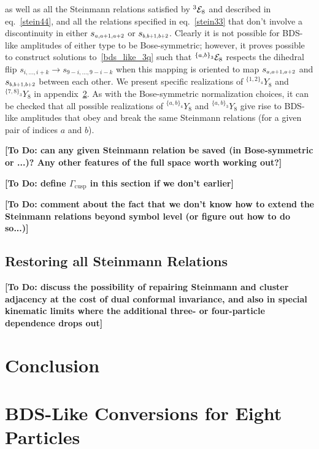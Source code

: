 \documentclass[11pt]{article}
\def\draftnote#1{{\bf [#1]}}
\def\mand#1{\scaleto{s}{4.6pt}_{\scaleto{#1}{5.2pt}}}
\def\EthreeJ{{}^{{\{a,b\}}_3} {\cal E}_8}
\begin{document}
as well as all the Steinmann relations satisfied by ${}^3 {\cal E}_8$ and described in eq.~\eqref{stein44}, and all the relations specified in eq.~\eqref{stein33} that don't involve a discontinuity in either $\mand{a,a+1,a+2}$ or $\mand{b,b+1,b+2}$. Clearly it is not possible for BDS-like amplitudes of either type to be Bose-symmetric; however, it proves possible to construct solutions to~\eqref{bds_like_3q} such that $\EthreeJ$ respects the dihedral flip $s_{i,\dots,i+k} \rightarrow s_{9-i,\dots,9-i-k}$ when this mapping is oriented to map $\mand{a,a+1,a+2}$ and $\mand{b,b+1,b+2}$ between each other. We present specific realizations of ${}^{{\{1,2\}}_4} Y_{8}$ and ${}^{{\{7,8\}}_3} Y_{8}$ in appendix~\ref{appendix:bds_like}. As with the Bose-symmetric normalization choices, it can be checked that all possible realizations of ${}^{{\{a,b\}}_4} Y_{8}$ and ${}^{{\{a,b\}}_3} Y_{8}$ give rise to BDS-like amplitudes that obey and break the same Steinmann relations (for a given pair of indices $a$ and $b$). 



\newpage

\draftnote{To Do: can any given Steinmann relation be saved (in Bose-symmetric or ...)? Any other features of the full space worth working out?}

\draftnote{To Do: define $\Gamma_{\text{cusp}}$ in this section if we don't earlier}

\draftnote{To Do: comment about the fact that we don't know how to extend the Steinmann relations beyond symbol level (or figure out how to do so...)}

\subsection{Restoring all Steinmann Relations}

\draftnote{To Do: discuss the possibility of repairing Steinmann and cluster adjacency at the cost of dual conformal invariance, and also in special kinematic limits where the additional three- or four-particle dependence drops out}

\section{Conclusion}

\appendix

\section{BDS-Like Conversions for Eight Particles} \label{appendix:bds_like}
\end{document}
